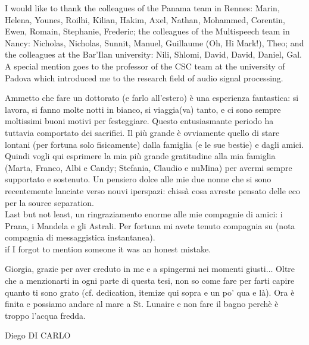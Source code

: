 \mynewline
I would like to thank the colleagues of the Panama team in Rennes: Marin, Helena, Younes, Roilhi, Kilian, Hakim, Axel, Nathan, Mohammed, Corentin, Ewen, Romain, Stephanie, Frederic;
the colleagues of the Multispeech team in Nancy: Nicholas, Nicholas, Sunnit, Manuel, Guillaume (Oh, Hi Mark!), Theo;
and the colleagues at the Bar'Ilan university: Nili, Shlomi, David, David, Daniel, Gal.
A special mention goes to the professor of the CSC team at the university of Padova which introduced me to the research field of audio signal processing.

\mynewline
Ammetto che fare un dottorato (e farlo all'estero) \`e una esperienza fantastica:
si lavora,
si fanno molte notti in bianco, si viaggia(va) tanto, e ci sono sempre moltissimi buoni motivi per festeggiare.
Questo entusiasmante periodo ha tuttavia comportato dei sacrifici.
Il pi\`u grande \`e ovviamente quello di stare lontani (per fortuna solo fisicamente) dalla famiglia (e le sue bestie) e dagli amici.
Quindi vogli qui esprimere la mia pi\`u grande gratitudine alla mia famiglia (Marta, Franco, Albi e Candy; Stefania, Claudio e nuMina) per avermi sempre supportato e sostenuto.
Un pensiero dolce alle mie due nonne che si sono recentemente lanciate verso nouvi iperspazi: chiss\`a cosa avreste pensato delle eco per la source separation.
\\Last but not least, un ringraziamento enorme alle mie compagnie di amici: i Prana, i Mandela e gli Astrali.
Per fortuna mi avete tenuto compagnia su (nota compagnia di messaggistica instantanea).
\\if I forgot to mention someone it was an honest mistake.

\mynewline
Giorgia, grazie per aver creduto in me e a spingermi nei momenti giusti$\ldots$
Oltre che a menzionarti in ogni parte di questa tesi, non so come fare per farti capire quanto ti sono grato (cf. dedication, itemize qui sopra e un po' qua e l\`a).
Ora \`e finita e possiamo andare al mare a St. Lunaire e non fare il bagno perch\`e \`e troppo l'acqua fredda.

\begin{flushright}
    Diego DI CARLO
\end{flushright}